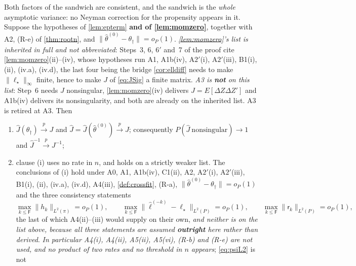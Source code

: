 \begin{lemma}\label{lem:sandwich}
Both factors of the sandwich are consistent, and the sandwich is the \emph{whole} asymptotic variance: no
Neyman correction for the propensity appears in it.
Suppose the hypotheses of \cref{lem:epterm} \textbf{and of \cref{lem:momzero}}, together with A2,
(R-e) of \cref{thm:rootn}, and $\|\hat\theta^{(0)}-\theta_\dagger\|=o_P(1)$. \emph{\cref{lem:momzero}'s list
is inherited in full and not abbreviated}: Steps~3, 6, 6$'$ and~7 of the proof cite
\cref{lem:momzero}\textup{(ii)}--\textup{(iv)}, whose hypotheses run A1, A1b(iv), A$2'$(i), A$2'$(iii),
B1(i), (ii), (iv.a), (iv.d), the last four being the bridge \cref{cor:elldiff} needs to make
$\|\ell_\star\|_\infty$ finite, hence to make $J$ of \eqref{eq:JSig} a finite matrix. \emph{A3 is
\textbf{not} on this list}: Step~6 needs $J$
nonsingular, \cref{lem:momzero}\textup{(iv)} delivers $J=E[\Delta Z\Delta Z']$ and A1b(iv) delivers its
nonsingularity, and both are already on the inherited list. A3 is retired at A3. Then
\begin{enumerate}
\item[(i)] $\hat J(\theta_\dagger)\xrightarrow{p}J$ and $\hat J=\hat J(\hat\theta^{(0)})\xrightarrow{p}J$;
consequently $P(\hat J\ \text{nonsingular})\to1$ and $\hat J^{-1}\xrightarrow{p}J^{-1}$;
\item[(i$'$)] clause \textup{(i)} uses no rate in $n$, and holds on a strictly weaker list. The
conclusions of \textup{(i)} hold under A0, A1, A1b(iv), C1(ii), A2, A$2'$(i), A$2'$(iii), B1(i), (ii),
(iv.a), (iv.d), A4(iii), \cref{def:crossfit}, (R-a), $\|\hat\theta^{(0)}-\theta_\dagger\|=o_P(1)$ and the three
consistency statements
\[
\max_{k\le\mathsf F}\big\|h_k\big\|_{L^{2}(\pi)}=o_P(1),
\qquad
\max_{k\le\mathsf F}\big\|\hat\ell^{(-k)}-\ell_\star\big\|_{L^{2}(P)}=o_P(1),
\qquad
\max_{k\le\mathsf F}\big\|\mathsf r_k\big\|_{L^{2}(P)}=o_P(1),
\]
the last of which A4(ii)--(iii) would supply on their own, \emph{and neither is on the list above,
because all three statements are assumed \textbf{outright} here rather than derived}. \emph{In particular
A4(i), A4(ii), A5(ii), A5(vi), (R-b) and
(R-e) are not used, and no product of two rates and no threshold in $n$ appears}; \eqref{eq:psiL2} is not

\end{enumerate}
\end{lemma}
